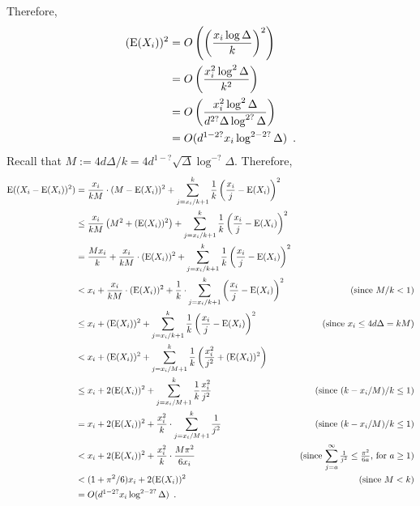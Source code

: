 \documentclass{patmorin}
\begin{document}
Therefore,
\begin{align*}
  (\mathrm{E}(X_i))^2
  & = O\left(\left(\frac{x_i\log \Delta}{k}\right)^2\right) \\
  & = O\left(\frac{x_i^2\log^2 \Delta}{k^2}\right) \\
  & = O\left(\frac{x_i^2\log^2 \Delta}{d^{2?}\Delta\log^{2?}\Delta}\right) \\
  & = O(d^{1-2?}x_i\log^{2-2?} \Delta) \enspace .
\end{align*}
Recall that $M:=4d\Delta/k=4d^{1-?}\sqrt{\Delta}\log^{-?}\Delta$. Therefore,
\begin{align*}
  \mathrm{E}((X_i-\mathrm{E}(X_i))^2)
  & = \frac{x_i}{kM}\cdot(M-\mathrm{E}(X_i))^2
    + \sum_{j=x_i/k+1}^k \frac{1}{k}\left(\frac{x_i}{j}-\mathrm{E}(X_i)\right)^2 \\
  & \le \frac{x_i}{kM}\left(M^2 + (\mathrm{E}(X_i))^2\right)
    + \sum_{j=x_i/k+1}^k \frac{1}{k}\left(\frac{x_i}{j}-\mathrm{E}(X_i)\right)^2 \\
  & = \frac{M x_i}{k} + \frac{x_i}{kM}\cdot (\mathrm{E}(X_i))^2
      + \sum_{j=x_i/k+1}^k \frac{1}{k}\left(\frac{x_i}{j}-\mathrm{E}(X_i)\right)^2 \\
  & < x_i + \frac{x_i}{kM}\cdot (\mathrm{E}(X_i))^2
      + \frac{1}{k}\cdot\sum_{j=x_i/k+1}^k \left(\frac{x_i}{j}-\mathrm{E}(X_i)\right)^2
      & \text{(since $M/k < 1$)} \\
  & \le x_i + (\mathrm{E}(X_i))^2
      + \sum_{j=x_i/k+1}^k \frac{1}{k}\left(\frac{x_i}{j}-\mathrm{E}(X_i)\right)^2
      & \text{\quad(since $x_i\le 4d\Delta= kM$)} \\
 & < x_i + (\mathrm{E}(X_i))^2 + \sum_{j=x_i/M+1}^k \frac{1}{k}\left(\frac{x_i^2}{j^2} + (\mathrm{E}(X_i))^2\right) \\
 & \le x_i + 2(\mathrm{E}(X_i))^2  +  \sum_{j=x_i/M+1}^k\frac{1}{k}\frac{x_i^2}{j^2}
 & \text{(since $(k-x_i/M)/k \le 1$)} \\
 & = x_i + 2(\mathrm{E}(X_i))^2  +  \frac{x_i^2}{k}\cdot \sum_{j=x_i/M+1}^k\frac{1}{j^2}
 & \text{(since $(k-x_i/M)/k \le 1$)} \\
 & < x_i + 2(\mathrm{E}(X_i))^2 + \frac{x_i^2}{k}\cdot\frac{M\pi^2}{6 x_i}
    & \text{(since $\sum_{j=a}^{\infty} \tfrac{1}{j^2} \le \tfrac{\pi^2}{6a}$, for $a\ge 1$)} \\
 & < (1+\pi^2/6)x_i + 2(\mathrm{E}(X_i))^2
    & \text{(since $M<k$)} \\
  & = O(d^{1-2?}x_i\log^{2-2?}\Delta) \enspace .
\end{align*}
\end{document}
